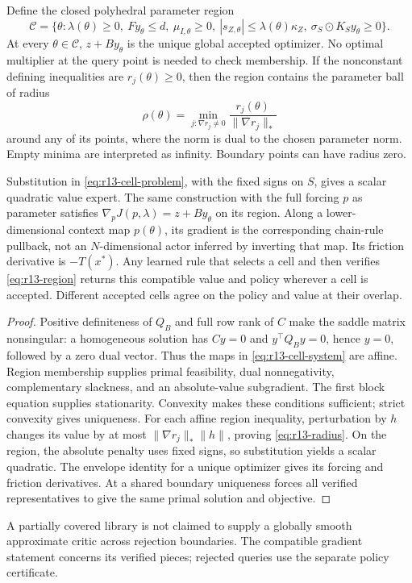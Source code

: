 \begin{theorem}\label{thm:r13-cells}
Define the closed polyhedral parameter region
\begin{equation}\label{eq:r13-region}
 \mathcal C=\{\theta:\lambda(\theta)\geq0,\ Fy_\theta\leq d,\
       \mu_{I,\theta}\geq0,\ |s_{Z,\theta}|\leq\lambda(\theta)\kappa_Z,\
       \sigma_S\mathbin{\odot}K_Sy_\theta\geq0\}.
\end{equation}
At every $\theta\in\mathcal C$, $z+By_\theta$ is the unique global accepted optimizer. No optimal multiplier at the query point is needed to check membership. If the nonconstant defining inequalities are $r_j(\theta)\geq0$, then the region contains the parameter ball of radius
\begin{equation}\label{eq:r13-radius}
 \rho(\theta)=\min_{j:\nabla r_j\ne0}
                 \frac{r_j(\theta)}{\|\nabla r_j\|_*}
\end{equation}
around any of its points, where the norm is dual to the chosen parameter norm. Empty minima are interpreted as infinity. Boundary points can have radius zero.

Substitution in \eqref{eq:r13-cell-problem}, with the fixed signs on $S$, gives a scalar quadratic value expert. The same construction with the full forcing $p$ as parameter satisfies $\nabla_p J(p,\lambda)=z+By_\theta$ on its region. Along a lower-dimensional context map $p(\theta)$, its gradient is the corresponding chain-rule pullback, not an $N$-dimensional actor inferred by inverting that map. Its friction derivative is $-T(x^*)$. Any learned rule that selects a cell and then verifies \eqref{eq:r13-region} returns this compatible value and policy wherever a cell is accepted. Different accepted cells agree on the policy and value at their overlap.
\end{theorem}
\begin{proof}
Positive definiteness of $Q_B$ and full row rank of $C$ make the saddle matrix nonsingular: a homogeneous solution has $Cy=0$ and $y^\top Q_By=0$, hence $y=0$, followed by a zero dual vector. Thus the maps in \eqref{eq:r13-cell-system} are affine. Region membership supplies primal feasibility, dual nonnegativity, complementary slackness, and an absolute-value subgradient. The first block equation supplies stationarity. Convexity makes these conditions sufficient; strict convexity gives uniqueness. For each affine region inequality, perturbation by $h$ changes its value by at most $\|\nabla r_j\|_*\|h\|$, proving \eqref{eq:r13-radius}. On the region, the absolute penalty uses fixed signs, so substitution yields a scalar quadratic. The envelope identity for a unique optimizer gives its forcing and friction derivatives. At a shared boundary uniqueness forces all verified representatives to give the same primal solution and objective.
\end{proof}
A partially covered library is not claimed to supply a globally smooth approximate critic across rejection boundaries. The compatible gradient statement concerns its verified pieces; rejected queries use the separate policy certificate.

